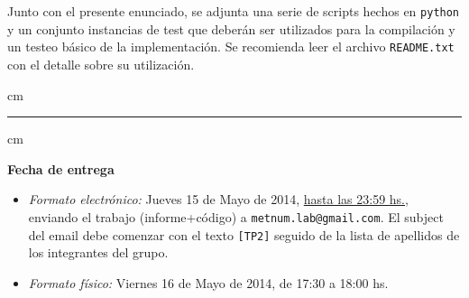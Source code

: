 \documentclass[11pt, a4paper]{article}
\begin{document}
Junto con el presente enunciado, se adjunta una serie de scripts hechos en \verb+python+ y un conjunto instancias de
test que deber\'an ser utilizados para la compilaci\'on y un testeo b\'asico de la implementaci\'on. Se recomienda leer
el archivo \verb+README.txt+ con el detalle sobre su utilizaci\'on.


 cm
\hrule
{} cm

{\bf Fecha de entrega} 
\begin{itemize}
\item \textsl{Formato electr\'onico:} Jueves 15 de Mayo de 2014, \underline{hasta las 23:59 hs.}, enviando el trabajo
(informe+c\'odigo) a \texttt{metnum.lab@gmail.com}. El subject del email debe comenzar con el texto \verb|[TP2]| seguido
de la lista de apellidos de los integrantes del grupo. 
\item \textsl{Formato f\'isico:} Viernes 16 de Mayo de 2014, de 17:30 a 18:00 hs.
\end{itemize}
\end{document}
